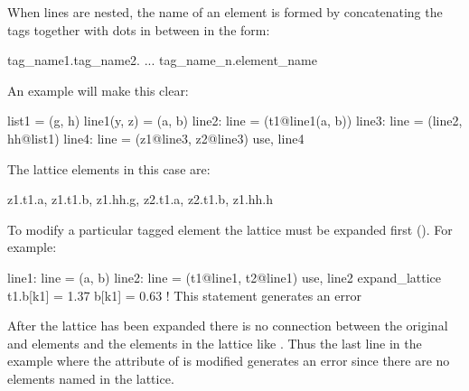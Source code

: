 When lines are nested, the name of an element is formed by concatenating the tags together with dots
in between in the form:
\begin{example}
  tag_name1.tag_name2. ... tag_name_n.element_name
\end{example}
An example will make this clear:
\begin{example}
  list1 = (g, h)
  line1(y, z) = (a, b)
  line2: line = (t1@line1(a, b))
  line3: line = (line2, hh@list1)
  line4: line = (z1@line3, z2@line3)
  use, line4
\end{example}
The lattice elements in this case are:
\begin{example}
  z1.t1.a, z1.t1.b, z1.hh.g, z2.t1.a, z2.t1.b, z1.hh.h 
\end{example}

To modify a particular tagged element the lattice must be expanded
first (). For example:
\begin{example}
  line1: line = (a, b)
  line2: line = (t1@line1, t2@line1)
  use, line2
  expand_lattice
  t1.b[k1] = 1.37
  b[k1] = 0.63       ! This statement generates an error
\end{example}
After the lattice has been expanded there is no connection between the original  and 
elements and the elements in the lattice like . Thus the last line in the example where the
 attribute of is modified generates an error since there are no elements named 
in the lattice.
